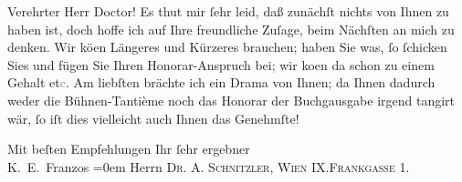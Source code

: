 \pstart{}Verehrter Herr Doctor!\pend\vspace{0.5em}
\pstart
           Es thut mir{ }ſehr leid, daß zunächſt nichts von Ihnen zu haben ist, doch hoffe ich auf
               Ihre freundliche Zuſage, beim Nächſten an mich zu denken. Wir kö{\geminationn}en Längeres und Kürzeres brauchen; haben Sie was,{ }ſo{ }ſchicken Sies und fügen Sie Ihren Honorar-Anspruch bei; wir ko{\geminationm}en da{\geminationn} schon zu einem
               Gehalt et\textcolor{gray}{c}. Am liebſten brächte ich ein Drama von Ihnen; da
               Ihnen dadurch weder die Bühnen-Tantième noch das Honorar der Buchgausgabe irgend
               tangirt wär,{ }ſo iſt dies vielleicht auch Ihnen das Genehmſte!\pend
           
\pstart
           Mit beſten Empfehlungen Ihr{ }ſehr ergebner{\\[\baselineskip]}\spacefill\mbox{K. E. Franzos}\pend
           \leftskip=0em{}
\pstart
           \noindent{}Herrn \textsc{Dr. A. Schnitzler, Wien
                        IX.Frankgasse 1.}\pend
           \endnumbering{}  \newcommand{\dateiname}{L03620}\newcommand{\titel}{Karl Emil Franzos an Arthur Schnitzler, 8. 9. 1900}\newcommand{\editorInnen}{Selma Jahnke und Martin Anton Müller}
